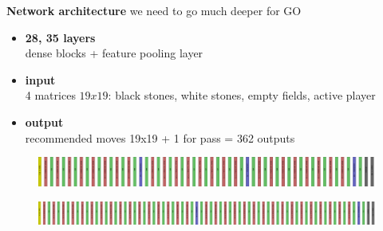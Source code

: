 \documentclass[xcolor=dvipsnames]{beamer}
\begin{document}
\begin{frame}{\bf Network architecture}
we need to go much deeper for GO
\begin{itemize}
  \item {\bf 28, 35 layers} \\ dense blocks + feature pooling layer
  \item {\bf input} \\ 4 matrices $19x19$: black stones, white stones, empty fields, active player
  \item {\bf output} \\ recommended moves 19x19 + 1 for pass = 362 outputs

\end{itemize}

  \begin{figure}[!htb]
    \centering
    \includegraphics[scale=0.06]{../../diagrams/net_go_1_28_layers.png}
  \end{figure}

  \begin{figure}[!htb]
    \centering
    \includegraphics[scale=0.06]{../../diagrams/net_go_5_35_layers.png}
  \end{figure}

\end{frame}
\end{document}
